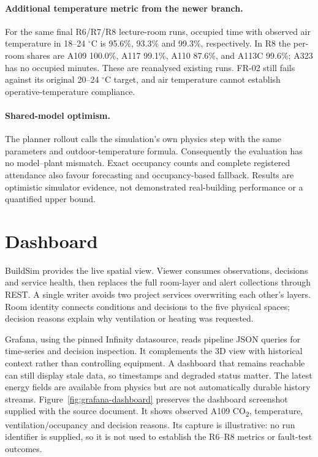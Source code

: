 \documentclass[11pt,a4paper]{article}
\begin{document}
\paragraph{Additional temperature metric from the newer branch.}
For the same final R6/R7/R8 lecture-room runs, occupied time with observed air temperature in 18--24 $^\circ$C is 95.6\%, 93.3\% and 99.3\%, respectively. In R8 the per-room shares are A109 100.0\%, A117 99.1\%, A110 87.6\%, and A113C 99.6\%; A323 has no occupied minutes. These are reanalysed existing runs. FR-02 still fails against its original 20--24 $^\circ$C target, and air temperature cannot establish operative-temperature compliance.

\paragraph{Shared-model optimism.}
The planner rollout calls the simulation's own physics step with the same parameters and outdoor-temperature formula. Consequently the evaluation has no model--plant mismatch. Exact occupancy counts and complete registered attendance also favour forecasting and occupancy-based fallback. Results are optimistic simulator evidence, not demonstrated real-building performance or a quantified upper bound.

\section{Dashboard}
BuildSim provides the live spatial view. Viewer consumes observations, decisions and service health, then replaces the full room-layer and alert collections through REST. A single writer avoids two project services overwriting each other's layers. Room identity connects conditions and decisions to the five physical spaces; decision reasons explain why ventilation or heating was requested.

Grafana, using the pinned Infinity datasource, reads pipeline JSON queries for time-series and decision inspection. It complements the 3D view with historical context rather than controlling equipment. A dashboard that remains reachable can still display stale data, so timestamps and degraded status matter. The latest energy fields are available from physics but are not automatically durable history streams. Figure~\ref{fig:grafana-dashboard} preserves the dashboard screenshot supplied with the source document. It shows observed A109 CO\textsubscript{2}, temperature, ventilation/occupancy and decision reasons. Its capture is illustrative: no run identifier is supplied, so it is not used to establish the R6--R8 metrics or fault-test outcomes.
\end{document}
